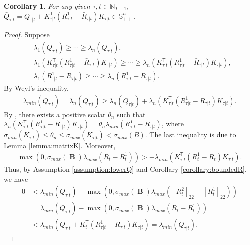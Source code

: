 \documentclass[letterpaper, 10 pt, conference]{ieeeconf}  %
\newcommand{\transpose}{\mathsf{T}}
\DeclareMathOperator{\contB}{\mathbf{B}}
\newtheorem{corollary}{Corollary}
\begin{document}
\begin{corollary}
    For any given $\tau,t\in\mathbb{N}_{T-1}$, 
       $ \bar{Q}_{\tau|t} = Q_{\tau|t} + K_{\tau|t}^{\transpose}(R_{\tau|t}^{1} - \bar{R}_{\tau|t})K_{\tau|t} \in \mathbb{S}^{n}_{++}$.
\end{corollary}
\begin{proof}
    Suppose
    \begin{align*}
        &\lambda_{1}(Q_{\tau|t}) \geq \cdots \geq \lambda_{n}(Q_{\tau|t}),\\
        &\lambda_{1}(K_{\tau|t}^{\transpose}(R_{\tau|t}^{1} - \bar{R}_{\tau|t})K_{\tau|t}) \geq \cdots \geq \lambda_{n}(K_{\tau|t}^{\transpose}(R_{\tau|t}^{1} - \bar{R}_{\tau|t})K_{\tau|t}),\\
        &\lambda_{1}(R_{\tau|t}^{1} - \bar{R}_{\tau|t}) \geq \cdots \geq \lambda_{n}(R_{\tau|t}^{1} - \bar{R}_{\tau|t}).
    \end{align*}
    By Weyl's inequality,
    \begin{align*}
        \lambda_{min}(\bar{Q}_{\tau|t}) = \lambda_{n}(\bar{Q}_{\tau|t})\geq \lambda_{n}(Q_{\tau|t}) + \lambda_{n}(K_{\tau|t}^{\transpose}(R_{\tau|t}^{1} - \bar{R}_{\tau|t})K_{\tau|t}).
    \end{align*}
    By \cite[Theorem 4.5.9]{horn_matrix_2013}, there exists a positive scalar $\theta_{n}$ such that
        $\lambda_{n}(K_{\tau|t}^{\transpose}(R_{\tau|t}^{1} - \bar{R}_{\tau|t})K_{\tau|t}) = \theta_{n}\lambda_{min}(R_{\tau|t}^{1} - \bar{R}_{\tau|t})$,
    where $\sigma_{min}(K_{\tau|t}) \leq \theta_{n} \leq \sigma_{max}(K_{\tau|t}) < \sigma_{max}(B)$.
    The last inequality is due to Lemma \ref{lemma:matrixK}. 
    Moreover,
    \begin{align*}
        \max(0, \sigma_{max}(\contB)\lambda_{max}(\bar{R}_{t}-R_{t}^{1})) > -\lambda_{min}(K_{\tau|t}^{\transpose}(R_{t}^{1}-\bar{R}_{t})K_{\tau|t}).
    \end{align*}
    Thus, by Assumption \ref{assumption:lowerQ} and Corollary \ref{corollary:boundedR}, we have
    \begin{align*}
    0 &<  \lambda_{min}(Q_{\tau|t}) -\max(0,\sigma_{max}(\contB)\lambda_{max}([R_{t}^{2}]_{22} - [R_{t}^{1}]_{22}))\\
    &=\lambda_{min}(Q_{\tau|t}) - \max(0, \sigma_{max}(\contB)\lambda_{max}(\bar{R}_{t}-R_{t}^{1})) \\
    &< \lambda_{min}(Q_{\tau|t}+K_{t}^{\transpose}(R_{\tau|t}^{1}-\bar{R}_{\tau|t})K_{\tau|t})= \lambda_{min}(\bar{Q}_{\tau|t}).
    \end{align*}

\end{proof}
\end{document}
